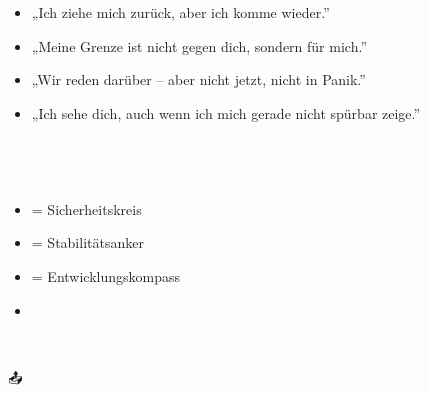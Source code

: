 \hfill\break
\hfill\break

\hypertarget{schluxfcsselsuxe4tze-fuxfcr-sichere-bindung}{%
\subsection[ 💬 \ul{\textbf{\textcolor{ctmmBlue}{\1}}}]{\texorpdfstring{\protect\hypertarget{schluxfcsselsuxe4tze-fuxfcr-sichere-bindung}{}{} 💬 \ul{\textbf{\textcolor{ctmmBlue}{\1}}}}{ 💬 SCHLÜSSELSÄTZE FÜR SICHERE BINDUNG}}\label{schluxfcsselsuxe4tze-fuxfcr-sichere-bindung}}

\begin{itemize}[label=\textcolor{ctmmOrange}{\faArrowRight}]
\item
  „Ich ziehe mich zurück, aber ich komme wieder.''
\item
  „Meine Grenze ist nicht gegen dich, sondern für mich.''
\item
  „Wir reden darüber -- aber nicht jetzt, nicht in Panik.''
\item
  „Ich sehe dich, auch wenn ich mich gerade nicht spürbar zeige.''
\end{itemize}

\hfill\break
\hfill\break

\hypertarget{zusammenspiel-der-module}{%
\subsection[🔗 \ul{\textbf{\textcolor{ctmmBlue}{\1}}}]{\texorpdfstring{\protect\hypertarget{zusammenspiel-der-module}{}{}🔗 \ul{\textbf{\textcolor{ctmmBlue}{\1}}}}{🔗 ZUSAMMENSPIEL DER MODULE}}\label{zusammenspiel-der-module}}

\begin{itemize}[label=\textcolor{ctmmOrange}{\faArrowRight}]
\item
  \textbf{\textcolor{ctmmBlue}{\1}} \textbf{\textcolor{ctmmBlue}{\1}} \textbf{\textcolor{ctmmBlue}{\1}} \textbf{\textcolor{ctmmBlue}{\1}} \textbf{\textcolor{ctmmBlue}{\1}} = Sicherheitskreis
\item
  \textbf{\textcolor{ctmmBlue}{\1}} \textbf{\textcolor{ctmmBlue}{\1}} \textbf{\textcolor{ctmmBlue}{\1}} \textbf{\textcolor{ctmmBlue}{\1}} \textbf{\textcolor{ctmmBlue}{\1}} = Stabilitätsanker
\item
  \textbf{\textcolor{ctmmBlue}{\1}} \textbf{\textcolor{ctmmBlue}{\1}} \textbf{\textcolor{ctmmBlue}{\1}} \textbf{\textcolor{ctmmBlue}{\1}} \textbf{\textcolor{ctmmBlue}{\1}} = Entwicklungskompass
\item
\end{itemize}

📎 \textbf{\textcolor{ctmmBlue}{\1}}

\hfill\break
\hfill\break

📤 \textcolor{ctmmGreen}{\textit{\1}}

\textcolor{ctmmGreen}{\textit{\1}}
